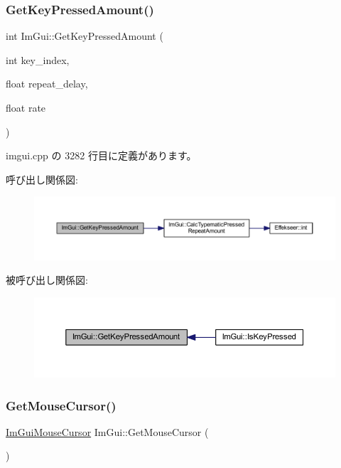\subsubsection{\texorpdfstring{Get\+Key\+Pressed\+Amount()}{GetKeyPressedAmount()}}
{\footnotesize\ttfamily int Im\+Gui\+::\+Get\+Key\+Pressed\+Amount (\begin{DoxyParamCaption}\item[{int}]{key\+\_\+index,  }\item[{float}]{repeat\+\_\+delay,  }\item[{float}]{rate }\end{DoxyParamCaption})}



 imgui.\+cpp の 3282 行目に定義があります。

呼び出し関係図\+:\nopagebreak
\begin{figure}[H]
\begin{center}
\leavevmode
\includegraphics[width=350pt]{namespace_im_gui_ad94a09fc01052f02fe11bec5a3c11275_cgraph}
\end{center}
\end{figure}
被呼び出し関係図\+:\nopagebreak
\begin{figure}[H]
\begin{center}
\leavevmode
\includegraphics[width=350pt]{namespace_im_gui_ad94a09fc01052f02fe11bec5a3c11275_icgraph}
\end{center}
\end{figure}
\mbox{\label{namespace_im_gui_a3b955bb840a2411f7c19ac6687d57392}} 
\subsubsection{\texorpdfstring{Get\+Mouse\+Cursor()}{GetMouseCursor()}}
{\footnotesize\ttfamily \mbox{\hyperlink{imgui_8h_a9223d6c82bb5d12c2eab5f829ca520ef}{Im\+Gui\+Mouse\+Cursor}} Im\+Gui\+::\+Get\+Mouse\+Cursor (\begin{DoxyParamCaption}{ }\end{DoxyParamCaption})}



